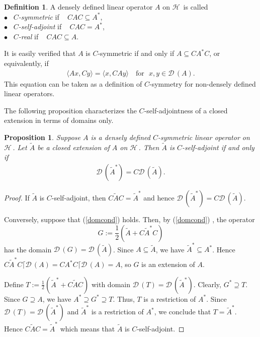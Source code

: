 \documentclass[12pt]{amsart}
\newtheorem{prop}[thm]{Proposition}
\theoremstyle{definition}
\newtheorem{defn}[thm]{Definition}
\newcommand{\cD}{\mathcal{D}\,}
\newcommand{\cH}{\mathcal{H}\,}
\begin{document}
\begin{defn}
A densely defined linear operator $A$ on $\cH$ is called\\
$\bullet$~  \emph{$C$-symmetric} if ~ $CAC\subseteq A^*$,\\
$\bullet$~  \emph{$C$-self-adjoint} if ~ $CAC= A^*$,\\
$\bullet$~  \emph{$C$-real} if ~ $CAC\subseteq A$.
\end{defn}
It is easily verified that $A$ is $C$-symmetric if and only if $A\subseteq CA^*C$, or equivalently, if
\begin{align*}
\langle Ax,Cy\rangle =\langle x, CA y\rangle \quad \textrm{for}~~~x,y\in \cD(A).
\end{align*}
This equation can be taken as a definition of $C$-symmetry  for non-densely defined linear operators.

The following proposition characterizes the $C$-self-adjointness of a closed extension in terms of  domains only.
\begin{prop}\label{kvit01aa} Suppose  $A$ is a densely defined $C$-symmetric linear operator on $\cH$. Let $\widetilde{A}$ be a closed extension of $A$ on $\cH$. Then $\widetilde{A}$ is $C$-self-adjoint if and only if
\begin{align}\label{domcond}
\cD(\widetilde{A}^*)=C\cD(\widetilde{A}).
\end{align}
\end{prop}
\begin{proof}
If $\widetilde{A}$ is $C$-self-adjoint, then $C\widetilde{A}C= \widetilde{A}^*$ and hence $\cD(\tilde{A}^*)=C\cD(\widetilde{A}).$

Conversely, suppose that (\ref{domcond}) holds. Then, by (\ref{domcond}) , the operator
\[ %
G:=\frac{1}{2}( \widetilde{A}+ C\widetilde{A}^*C)
\] %
has the domain $ \cD(G)=\cD(\widetilde{A})$. Since $A\subseteq \widetilde{A}$, we have $\widetilde{A}^*\subseteq A^*$. Hence $C\widetilde{A}^*C \lceil \cD(A)= CA^*C\lceil \cD(A)=A$, so $G$ is an extension of $A$.

Define $T:=\frac{1}{2}( \widetilde{A}^*+ C\widetilde{A}C)$ with domain $\cD(T)=\cD(\widetilde{A}^*)$. Clearly, $G^*\supseteq T$. Since $G\supseteq A$, we have $A^*\supseteq G^*\supseteq T$. Thus, $T$ is a restriction of $A^*$. Since $\cD(T)=\cD(\widetilde{A}^*)$ and $\widetilde{A}^*$ is a restriction of $A^*$, we conclude that $T=\widetilde{A}^*$. Hence
$C\widetilde{A}C=\widetilde{A}^*$ which means that $\widetilde{A}$ is $C$-self-adjoint.
\end{proof}
\end{document}
